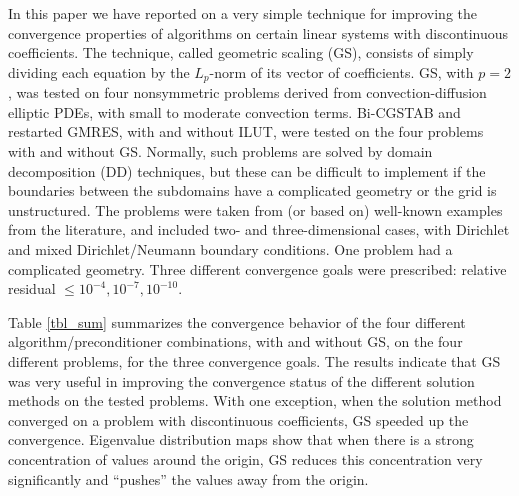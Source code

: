 \documentclass[12pt,a4paper]{article}
\newcounter{i}
\begin{document}
In this paper we have reported on a very simple technique for 
improving the convergence properties of algorithms on certain 
linear systems with discontinuous coefficients.  The technique, 
called geometric scaling (GS), consists of simply dividing each 
equation by the $L_p$-norm of its vector of coefficients.  
GS, with $p=2$, was tested on four nonsymmetric problems derived 
from convection-diffusion elliptic PDEs, with small to moderate 
convection terms.  Bi-CGSTAB and restarted GMRES, with and 
without ILUT, were tested on the four problems with and without 
GS.  Normally, such problems are solved by domain decomposition 
(DD) techniques, but these can be difficult to implement if the 
boundaries between the subdomains have a complicated geometry 
or the grid is unstructured.  The problems were taken from (or 
based on) well-known examples from the literature, and included 
two- and three-dimensional cases, with Dirichlet and mixed 
Dirichlet/Neumann boundary conditions.  One problem had a 
complicated geometry.  Three different convergence goals were
prescribed: relative residual $\le 10^{-4}, 10^{-7}, 10^{-10}$.

Table \ref{tbl_sum} summarizes the convergence behavior of the four
different algorithm/preconditioner combinations, with and without 
GS, on the four different problems, for the three convergence goals.
The results indicate that GS was very useful in improving the 
convergence status of the different solution methods on the tested 
problems.  With one exception, when the solution method converged 
on a problem with discontinuous coefficients, GS speeded up the 
convergence.  Eigenvalue distribution maps show that when there 
is a strong concentration of values around the origin, GS reduces 
this concentration very significantly and ``pushes'' the values 
away from the origin.
\end{document}
